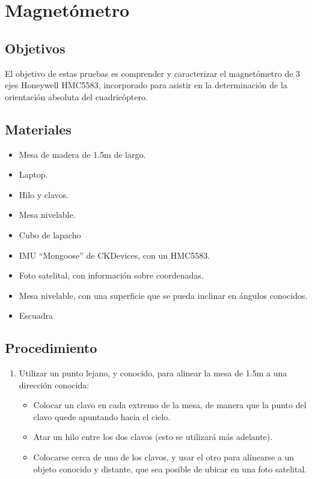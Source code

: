 \documentclass[spanish,12pt,a4paper,titlepage]{report}
\begin{document}
\chapter{Magnetómetro}
\label{chap:magnetometro}

\section{Objetivos}

El objetivo de estas pruebas es comprender y caracterizar el magnetómetro de 3 ejes Honeywell HMC5583, incorporado para asistir en la determinación de la orientación absoluta del cuadricóptero.

\section{Materiales}
\label{sec:materiales}

\begin{itemize}
\item Mesa de madera de 1.5m de largo.
\item Laptop.
\item Hilo y clavos.
\item Mesa nivelable.
\item Cubo de lapacho
\item IMU ``Mongoose'' de CKDevices, con un HMC5583.
\item Foto satelital, con información sobre coordenadas.
\item Mesa nivelable, con una superficie que se pueda inclinar en ángulos conocidos.
\item Escuadra
\end{itemize}

\newpage
\section{Procedimiento}
\label{sec:procedimiento}

\begin{enumerate}
\item Utilizar un punto lejano, y conocido, para alinear la mesa de 1.5m a una dirección conocida:
  \begin{itemize}
  \item Colocar un clavo en cada extremo de la mesa, de manera que la punto del clavo quede apuntando hacia el cielo.
  \item Atar un hilo entre los dos clavos (esto se utilizará más adelante).
  \item Colocarse cerca de uno de los clavos, y usar el otro para alinearse a un objeto conocido y distante, que sea posible de ubicar en una foto satelital.
  \end{itemize}

\end{enumerate}
\end{document}
